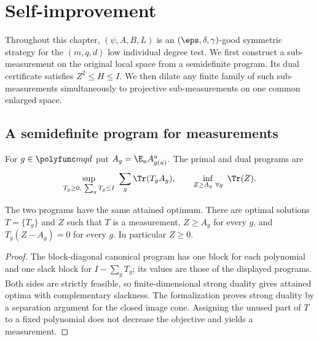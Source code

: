 \chapter{Self-improvement}
\label{chap:self-improvement}
\label{sec:self-improvement}

Throughout this chapter, $(\psi,A,B,L)$ is an $(\eps,\delta,\gamma)$-good
symmetric strategy for the $(m,q,d)$ low individual degree test.  We first
construct a sub-measurement on the original local space from a semidefinite
program.  Its dual certificate satisfies $Z^2\le H\le I$.  We then dilate any
finite family of such sub-measurements simultaneously to projective
sub-measurements on one common enlarged space.

\section{A semidefinite program for measurements}

For $g\in\polyfunc mqd$ put $A_g=\E_uA^u_{g(u)}$.  The primal and dual programs
are
\[
	\sup_{T_g\ge0,\ \sum_gT_g\le I}\ \sum_g\Tr(T_gA_g),
	\qquad
	\inf_{Z\ge A_g\ \forall g}\ \Tr(Z).
\]

\begin{lemma}\label{lem:sdp}
	\leanok
	The two programs have the same attained optimum.  There are optimal
	solutions $T=\{T_g\}$ and $Z$ such that $T$ is a measurement, $Z\ge A_g$
	for every $g$, and $T_g(Z-A_g)=0$ for every $g$.  In particular $Z\ge0$.
\end{lemma}
\begin{proof}
	\leanok
	The block-diagonal canonical program has one block for each polynomial
	and one slack block for $I-\sum_gT_g$; its values are those of the
	displayed programs.  Both sides are strictly feasible, so
	finite-dimensional strong duality gives attained optima with complementary
	slackness.  The formalization proves strong duality by a separation
	argument for the closed image cone.  Assigning the unused part of $T$ to a
	fixed polynomial does not decrease the objective and yields a measurement.
\end{proof}

